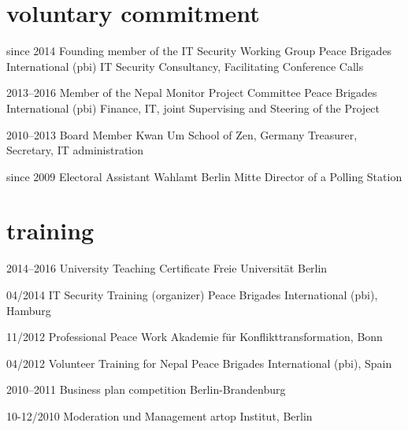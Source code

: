 \documentclass[]{friggeri-cv} %
\begin{document}
\section{voluntary commitment}

\begin{entrylist}

\entry
{since 2014}
{Founding member of the IT Security Working Group}
{Peace Brigades International (pbi)}
{IT Security Consultancy, Facilitating Conference Calls}

\entry
{2013--2016}
{Member of the Nepal Monitor Project Committee}
{Peace Brigades International (pbi)}
{Finance, IT, joint Supervising and Steering of the Project}

\entry
{2010--2013}
{Board Member}
{Kwan Um School of Zen, Germany}
{Treasurer, Secretary, IT administration}

\entry
{since 2009}
{Electoral Assistant}
{Wahlamt Berlin Mitte}
{Director of a Polling Station}

\end{entrylist}


\section{training }

\begin{entrylist}

\entry
{2014--2016}
{\normalfont University Teaching Certificate}
{Freie Universität Berlin}
{\vspace{-4mm}}

\entry
{04/2014}
{\normalfont IT Security Training (organizer)}
{Peace Brigades International (pbi), Hamburg}
{\vspace{-4mm}}

\entry
{11/2012}
{\normalfont Professional Peace Work}
{Akademie für Konflikttransformation, Bonn}
{\vspace{-4mm}}

\entry
{04/2012}
{\normalfont Volunteer Training for Nepal}
{Peace Brigades International (pbi), Spain}
{\vspace{-4mm}}

\entry
{2010--2011}
{\normalfont Business plan competition}
{Berlin-Brandenburg}
{\vspace{-4mm}}

\entry
{10-12/2010}
{\normalfont Moderation und Management}
{artop Institut, Berlin}
{\vspace{-4mm}}

\end{entrylist}
\end{document}
